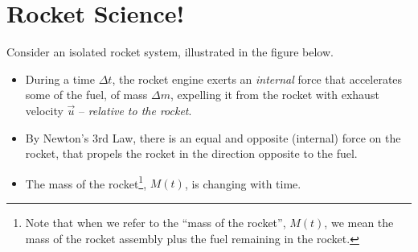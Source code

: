 \documentclass[11pt, letterpaper, openany]{book}
\begin{document}
\section*{Rocket Science!}

Consider an isolated rocket system, illustrated in the figure below.
\begin{itemize}
    \item During a time $\Delta t$, the rocket engine exerts an \textit{internal} force that accelerates some of the fuel, of mass $\Delta m$, expelling it from the rocket with exhaust velocity $\vec{u}$ -- \textit{relative to the rocket}.
    \item By Newton's 3rd Law, there is an equal and opposite (internal) force on the rocket, that propels the rocket in the direction opposite to the fuel.
    \item The mass of the rocket\footnote{Note that when we refer to the ``mass of the rocket'', $M(t)$, we mean the mass of the rocket assembly plus the fuel remaining in the rocket.}, $M(t)$, is changing with time.
\end{itemize}

\begin{center}
\end{center}
\end{document}
